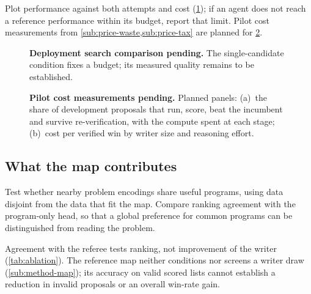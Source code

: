 Plot
performance against both attempts and cost (\cref{fig:searchone}); if an agent does not reach a
reference performance within its budget, report that limit.
Pilot cost measurements from \cref{sub:price-waste,sub:price-tax}
are planned for \cref{fig:price}.

\begin{figure}[t]
  \centering
  \caption{\textbf{Deployment search comparison pending.} The single-candidate
  condition fixes a budget; its measured quality remains to be established.}
  \label{fig:searchone}
\end{figure}

\begin{figure}[t]
  \centering
  \caption{\textbf{Pilot cost measurements pending.} Planned panels:
  (a)~the share of development proposals that run, score, beat the incumbent
  and survive re-verification, with the compute spent at each stage;
  (b)~cost per verified win by writer size and reasoning effort.
  }
  \label{fig:price}
\end{figure}

\subsection{What the map contributes}\label{sub:results-ablation}

Test whether nearby problem encodings share useful programs, using data
disjoint from the data that fit the map. Compare ranking agreement with the
program-only head, so that a global preference for common programs can be
distinguished from reading the problem.

Agreement with the referee tests ranking, not improvement of the writer
(\cref{tab:ablation}). The reference map neither conditions nor screens a
writer draw (\cref{sub:method-map}); its accuracy on valid scored lists
cannot establish a reduction in invalid proposals or an overall win-rate gain.

